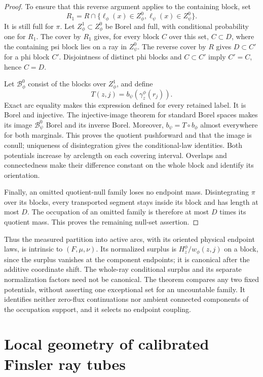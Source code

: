 \documentclass[11pt,reqno]{amsart}
\theoremstyle{definition}
\theoremstyle{remark}
\numberwithin{equation}{section}
\begin{document}
\begin{proof}
To ensure that this reverse argument applies to the containing block,
set
\[
 R_1=R\cap\{\ell_\phi(x)\in Z_\phi^0,
                  \ell_\psi(x)\in Z_\psi^0\}.
\]
It is still full for \(\pi\). Let \(Z_\phi^1\subset Z_\phi^0\)
be Borel and full, with conditional probability one for \(R_1\).
The cover by \(R_1\) gives, for every block \(C\) over this set,
\(C\subset D\), where the containing psi block lies on a ray in
\(Z_\psi^0\). The reverse cover by \(R\) gives
\(D\subset C'\) for a phi block \(C'\). Disjointness of distinct
phi blocks and \(C\subset C'\) imply \(C'=C\), hence \(C=D\).

Let \(\mathcal B_\phi^0\) consist of the blocks over
\(Z_\phi^1\), and define
\[
            T(z,j)=b_\psi(\gamma_z^\phi(r_j)).
\]
Exact arc equality makes this expression defined for every retained
label. It is Borel and injective. The injective-image theorem for
standard Borel spaces makes its image \(\mathcal B_\psi^0\)
Borel and its inverse Borel. Moreover,
\(b_\psi=T\circ b_\phi\) almost everywhere for both marginals.
This proves the quotient pushforward and that the image is conull;
uniqueness of disintegration gives the conditional-law identities.
Both potentials increase by arclength on each covering interval.
Overlaps and connectedness make their difference constant on the
whole block and identify its orientation.

Finally, an omitted quotient-null family loses no endpoint mass.
Disintegrating \(\pi\) over its blocks, every transported segment
stays inside its block and has length at most \(D\). The occupation
of an omitted family is therefore at most \(D\) times its quotient
mass. This proves the remaining null-set assertion.
\end{proof}

Thus the measured partition into active arcs, with its oriented
physical endpoint laws, is intrinsic to \((F,\mu,\nu)\).
Its normalized surplus is \(H_z^\phi/w_\phi(z,j)\) on a block,
since the surplus vanishes at the component endpoints; it is canonical
after the additive coordinate shift. The whole-ray conditional surplus
and its separate normalization factors need not be canonical.
The theorem compares any two fixed potentials, without asserting one
exceptional set for an uncountable family. It identifies neither
zero-flux continuations nor ambient connected components of the
occupation support, and it selects no endpoint coupling.


\section{Local geometry of calibrated Finsler ray tubes}
\label{sec:raytube}
\end{document}
